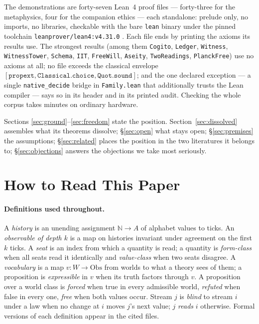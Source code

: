 \documentclass[11pt]{article}
\theoremstyle{remark}
\newcommand{\lf}[1]{\texttt{#1}}       %
\begin{document}
The demonstrations are forty-seven Lean~4 proof files --- forty-three for the metaphysics, four for the companion ethics --- each standalone: prelude only, no imports, no libraries, checkable with the bare \lf{lean} binary under the pinned toolchain \lf{leanprover/lean4:v4.31.0} \cite{demoura2021}. Each file ends by printing the axioms its results use. The strongest results (among them \lf{Cogito}, \lf{Ledger}, \lf{Witness}, \lf{WitnessTower}, \lf{Schema}, \lf{IIT}, \lf{FreeWill}, \lf{Aseity}, \lf{TwoReadings}, \lf{PlanckFree}) use no axioms at all; no file exceeds the classical envelope $[\lf{propext}, \lf{Classical.choice}, \lf{Quot.sound}]$; and the one declared exception --- a single \lf{native\_decide} bridge in \lf{Family.lean} that additionally trusts the Lean compiler --- says so in its header and in its printed audit. Checking the whole corpus takes minutes on ordinary hardware.

Sections \ref{sec:ground}--\ref{sec:freedom} state the position. Section~\ref{sec:dissolved} assembles what its theorems dissolve; \S\ref{sec:open} what stays open; \S\ref{sec:premises} the assumptions; \S\ref{sec:related} places the position in the two literatures it belongs to; \S\ref{sec:objections} answers the objections we take most seriously.

\section{How to Read This Paper}\label{sec:guide}

\paragraph{Definitions used throughout.} A \emph{history} is an unending assignment $\mathbb{N} \to A$ of alphabet values to ticks. An \emph{observable of depth $k$} is a map on histories invariant under agreement on the first $k$ ticks. A \emph{seat} is an index from which a quantity is read; a quantity is \emph{form-class} when all seats read it identically and \emph{value-class} when two seats disagree. A \emph{vocabulary} is a map $v : W \to \mathrm{Obs}$ from worlds to what a theory sees of them; a proposition is \emph{expressible} in $v$ when its truth factors through $v$. A proposition over a world class is \emph{forced} when true in every admissible world, \emph{refuted} when false in every one, \emph{free} when both values occur. Stream $j$ is \emph{blind} to stream $i$ under a law when no change at $i$ moves $j$'s next value; $j$ \emph{reads} $i$ otherwise. Formal versions of each definition appear in the cited files.
\end{document}
